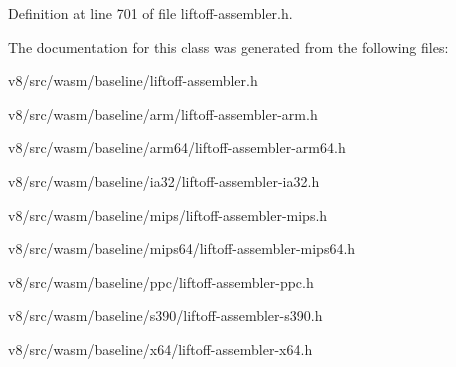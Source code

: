 Definition at line 701 of file liftoff-\/assembler.\+h.



The documentation for this class was generated from the following files\+:\begin{DoxyCompactItemize}
\item 
v8/src/wasm/baseline/liftoff-\/assembler.\+h\item 
v8/src/wasm/baseline/arm/liftoff-\/assembler-\/arm.\+h\item 
v8/src/wasm/baseline/arm64/liftoff-\/assembler-\/arm64.\+h\item 
v8/src/wasm/baseline/ia32/liftoff-\/assembler-\/ia32.\+h\item 
v8/src/wasm/baseline/mips/liftoff-\/assembler-\/mips.\+h\item 
v8/src/wasm/baseline/mips64/liftoff-\/assembler-\/mips64.\+h\item 
v8/src/wasm/baseline/ppc/liftoff-\/assembler-\/ppc.\+h\item 
v8/src/wasm/baseline/s390/liftoff-\/assembler-\/s390.\+h\item 
v8/src/wasm/baseline/x64/liftoff-\/assembler-\/x64.\+h\end{DoxyCompactItemize}
